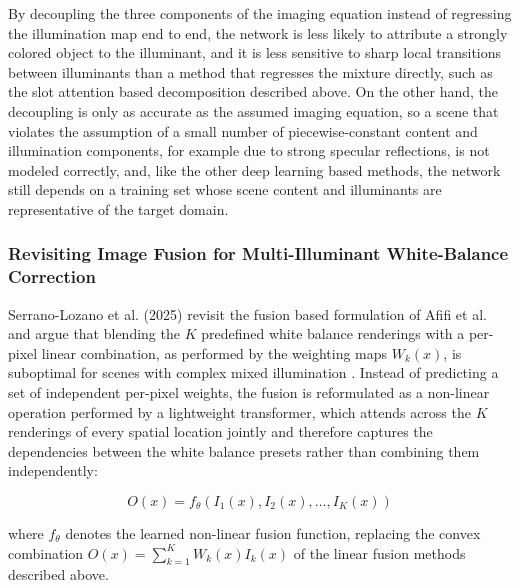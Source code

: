 By decoupling the three components of the imaging equation instead of regressing the illumination map end to end, the network is less likely to attribute a strongly colored object to the illuminant, and it is less sensitive to sharp local transitions between illuminants than a method that regresses the mixture directly, such as the slot attention based decomposition described above. On the other hand, the decoupling is only as accurate as the assumed imaging equation, so a scene that violates the assumption of a small number of piecewise-constant content and illumination components, for example due to strong specular reflections, is not modeled correctly, and, like the other deep learning based methods, the network still depends on a training set whose scene content and illuminants are representative of the target domain.

\subsubsection{Revisiting Image Fusion for Multi-Illuminant White-Balance Correction}

Serrano-Lozano et al. (2025) revisit the fusion based formulation of Afifi et al. and argue that blending the $K$ predefined white balance renderings with a per-pixel linear combination, as performed by the weighting maps $W_k(x)$, is suboptimal for scenes with complex mixed illumination \cite{revisitingImageFusionRenderedWB}. Instead of predicting a set of independent per-pixel weights, the fusion is reformulated as a non-linear operation performed by a lightweight transformer, which attends across the $K$ renderings of every spatial location jointly and therefore captures the dependencies between the white balance presets rather than combining them independently:

\begin{equation}
O(x) = f_{\theta}\left(I_1(x), I_2(x), \dots, I_K(x)\right)
\end{equation}

where $f_{\theta}$ denotes the learned non-linear fusion function, replacing the convex combination $O(x) = \sum_{k=1}^{K} W_k(x) I_k(x)$ of the linear fusion methods described above.

